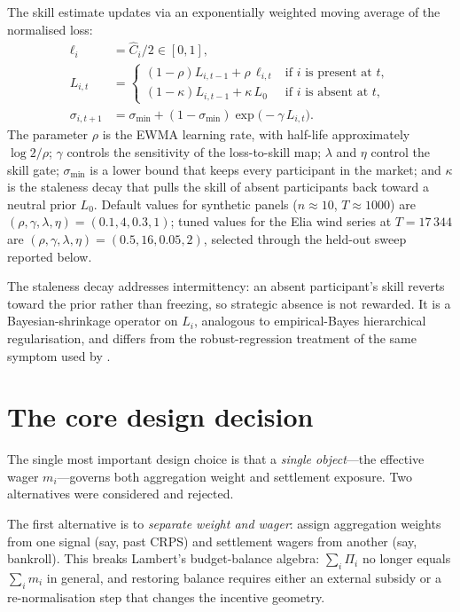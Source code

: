 \documentclass[
  11pt,
  a4paper,
  oneside]{report}
\begin{document}
The skill estimate updates via an exponentially weighted moving average
of the normalised loss: \begin{align}
  \ell_i &= \hat C_i / 2 \in [0, 1], \\
  L_{i, t} &=
  \begin{cases}
    (1 - \rho) L_{i, t - 1} + \rho\, \ell_{i, t}
      & \text{if $i$ is present at $t$}, \\
    (1 - \kappa) L_{i, t - 1} + \kappa\, L_0
      & \text{if $i$ is absent at $t$},
  \end{cases} \\
  \sigma_{i, t+1} &= \sigma_{\min}
    + (1 - \sigma_{\min}) \exp\!\big(-\gamma\, L_{i, t}\big).
\end{align} The parameter \(\rho\) is the EWMA learning rate, with
half-life approximately \(\log 2 / \rho\); \(\gamma\) controls the
sensitivity of the loss-to-skill map; \(\lambda\) and \(\eta\) control
the skill gate; \(\sigma_{\min}\) is a lower bound that keeps every
participant in the market; and \(\kappa\) is the staleness decay that
pulls the skill of absent participants back toward a neutral prior
\(L_0\). Default values for synthetic panels (\(n \approx 10\),
\(T \approx 1000\)) are
\((\rho, \gamma, \lambda, \eta) = (0.1, 4, 0.3, 1)\); tuned values for
the Elia wind series at \(T = 17\,344\) are
\((\rho, \gamma, \lambda, \eta) = (0.5, 16, 0.05, 2)\), selected through
the held-out sweep reported below.

The staleness decay addresses intermittency: an absent participant's
skill reverts toward the prior rather than freezing, so strategic
absence is not rewarded. It is a Bayesian-shrinkage operator on \(L_i\),
analogous to empirical-Bayes hierarchical regularisation, and differs
from the robust-regression treatment of the same symptom used by
\citet{vitali2025intermittent}.

\section{The core design decision}\label{the-core-design-decision}

The single most important design choice is that a \emph{single
object}---the effective wager \(m_i\)---governs both aggregation weight
and settlement exposure. Two alternatives were considered and rejected.

The first alternative is to \emph{separate weight and wager}: assign
aggregation weights from one signal (say, past CRPS) and settlement
wagers from another (say, bankroll). This breaks Lambert's
budget-balance algebra: \(\sum_i \Pi_i\) no longer equals \(\sum_i m_i\)
in general, and restoring balance requires either an external subsidy or
a re-normalisation step that changes the incentive geometry.
\end{document}
